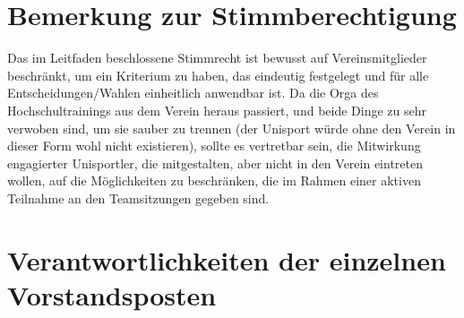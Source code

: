 \documentclass[a4 paper, 11pt]{article}
\begin{document}
\section{Bemerkung zur Stimmberechtigung}
Das im Leitfaden beschlossene Stimmrecht ist bewusst auf Vereinsmitglieder beschränkt, um ein Kriterium zu haben, das eindeutig festgelegt und für alle Entscheidungen/Wahlen einheitlich anwendbar ist. Da die Orga des Hochschultrainings aus dem Verein heraus passiert, und beide Dinge zu sehr verwoben sind, um sie sauber zu trennen (der Unisport würde ohne den Verein in dieser Form wohl nicht existieren), sollte es vertretbar sein, die Mitwirkung engagierter Unisportler, die mitgestalten, aber nicht in den Verein eintreten wollen, auf die Möglichkeiten zu beschränken, die im Rahmen einer aktiven Teilnahme an den Teamsitzungen gegeben sind.


\section{Verantwortlichkeiten der einzelnen Vorstandsposten} \label{ag_vorstand}
\end{document}
